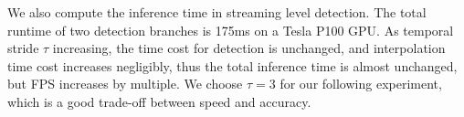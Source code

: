 \documentclass[letterpaper, 10pt, conference]{ieeeconf}  %
\begin{document}
We also compute the inference time in streaming level detection. The total runtime of two detection branches is 175ms on a Tesla P100 GPU. As temporal stride $\tau$ increasing, the time cost for detection is unchanged, and interpolation time cost increases negligibly, thus the total inference time is almost unchanged, but FPS increases by multiple. We choose $\tau = 3$ for our following experiment, which is a good trade-off between speed and accuracy.

\begin{table}
	\caption{Ablation study on KITTI Tracking validation datasets.}
	\label{label:result_tracking}
\end{table}
\end{document}
